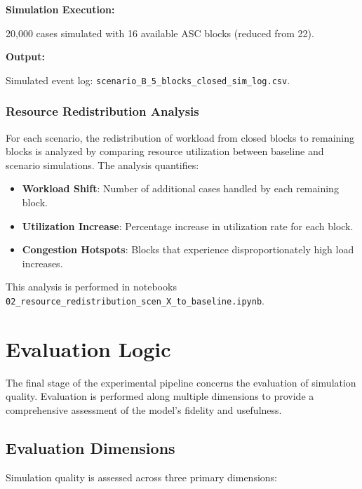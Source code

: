         \textbf{Simulation Execution:}
        
        20,000 cases simulated with 16 available ASC blocks (reduced from 22).
        
        \textbf{Output:}
        
        Simulated event log: \texttt{scenario\_B\_5\_blocks\_closed\_sim\_log.csv}.

        \subsubsection{Resource Redistribution Analysis}
        
        For each scenario, the redistribution of workload from closed blocks to remaining blocks is analyzed by comparing resource utilization between baseline and scenario simulations. The analysis quantifies:
        
        \begin{itemize}
            \item \textbf{Workload Shift}: Number of additional cases handled by each remaining block.
            \item \textbf{Utilization Increase}: Percentage increase in utilization rate for each block.
            \item \textbf{Congestion Hotspots}: Blocks that experience disproportionately high load increases.
        \end{itemize}
        
        This analysis is performed in notebooks \texttt{02\_resource\_redistribution\_scen\_X\_to\_baseline.ipynb}.


\section{Evaluation Logic}

The final stage of the experimental pipeline concerns the evaluation of simulation quality. Evaluation is performed along multiple dimensions to provide a comprehensive assessment of the model's fidelity and usefulness.

    \subsection{Evaluation Dimensions}
    
    Simulation quality is assessed across three primary dimensions:
    
